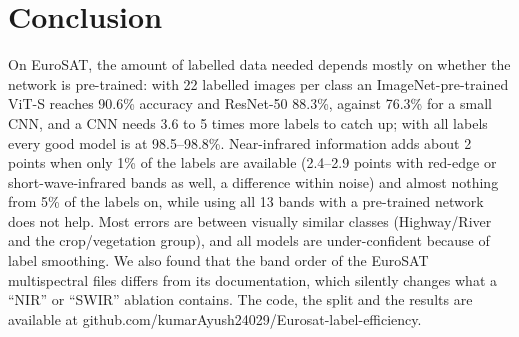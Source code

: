\documentclass[twoside,a4paper,11pt]{article}
\begin{document}
\section{Conclusion}

On EuroSAT, the amount of labelled data needed depends mostly on whether the network is pre-trained: with 22 labelled
images per class an ImageNet-pre-trained ViT-S reaches 90.6\% accuracy and ResNet-50 88.3\%, against 76.3\% for a
small CNN, and a CNN needs 3.6 to 5 times more labels to catch up; with all labels every good model is at 98.5--98.8\%.
Near-infrared information adds about 2 points when only 1\% of the labels are available (2.4--2.9 points with red-edge or
short-wave-infrared bands as well, a difference within noise) and almost nothing from 5\% of the labels on,
while using all 13 bands with a pre-trained network does not help. Most errors are between visually similar
classes (Highway/River and the crop/vegetation group), and all models are under-confident because of label smoothing.
We also found that the band order of the EuroSAT multispectral files differs from its documentation, which silently
changes what a ``NIR'' or ``SWIR'' ablation contains. The code, the split and the results are available at
github.com/kumarAyush24029/Eurosat-label-efficiency.
\end{document}
